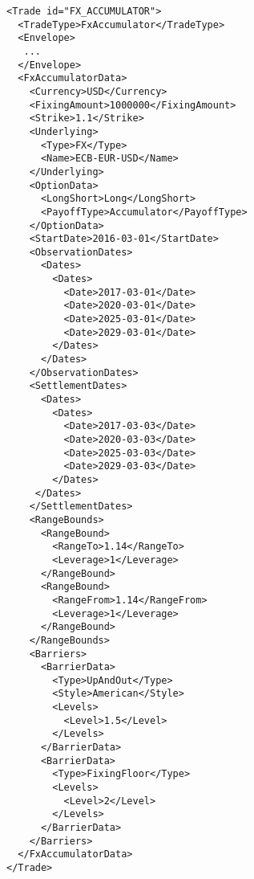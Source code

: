 \begin{verbatim}
<Trade id="FX_ACCUMULATOR">
  <TradeType>FxAccumulator</TradeType>
  <Envelope>
   ...
  </Envelope>
  <FxAccumulatorData>
    <Currency>USD</Currency>
    <FixingAmount>1000000</FixingAmount>
    <Strike>1.1</Strike>
    <Underlying>
      <Type>FX</Type>
      <Name>ECB-EUR-USD</Name>
    </Underlying>
    <OptionData>
      <LongShort>Long</LongShort>
      <PayoffType>Accumulator</PayoffType>
    </OptionData>
    <StartDate>2016-03-01</StartDate>
    <ObservationDates>
      <Dates>
        <Dates>
          <Date>2017-03-01</Date>
          <Date>2020-03-01</Date>
          <Date>2025-03-01</Date>
          <Date>2029-03-01</Date>
        </Dates>
      </Dates>
    </ObservationDates>
    <SettlementDates>
      <Dates>
        <Dates>
          <Date>2017-03-03</Date>
          <Date>2020-03-03</Date>
          <Date>2025-03-03</Date>
          <Date>2029-03-03</Date>
        </Dates>
     </Dates>
    </SettlementDates>
    <RangeBounds>
      <RangeBound>
        <RangeTo>1.14</RangeTo>
        <Leverage>1</Leverage>
      </RangeBound>
      <RangeBound>
        <RangeFrom>1.14</RangeFrom>
        <Leverage>1</Leverage>
      </RangeBound>
    </RangeBounds>
    <Barriers>
      <BarrierData>
        <Type>UpAndOut</Type>
        <Style>American</Style>
        <Levels>
          <Level>1.5</Level>
        </Levels>
      </BarrierData>
      <BarrierData>
        <Type>FixingFloor</Type>
        <Levels>
          <Level>2</Level>
        </Levels>
      </BarrierData>
    </Barriers>
  </FxAccumulatorData>
</Trade>
\end{verbatim}

